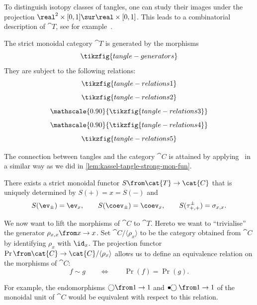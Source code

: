 To distinguish isotopy classes of tangles, one can study their images under the projection \(\real^2 \times [0,1] \sur \real \times [0,1]\).
This leads to a combinatorial description of \(\cat{T}\), see for example~\cite[Theorem~\textsc{xii}.2.2]{Kassel1998}.

\begin{proposition}\label{prop: presentation_tangle_category}
  The strict monoidal category \(\cat{T}\) is generated by the morphisms
  \[
    \tikzfig{tangle-generators}
  \]
  They are subject to the following relations:
  \[
    \tikzfig{tangle-relations1}
  \]
  \[
    \tikzfig{tangle-relations2}
  \]
  \[
    \mathscale{0.90}{\tikzfig{tangle-relations3}}
  \]
  \[
    \mathscale{0.90}{\tikzfig{tangle-relations4}}
  \]
  \[
    \tikzfig{tangle-relations5}
  \]
\end{proposition}

The connection between tangles and the category \(\cat{C}\) is attained by applying~\cite[Proposition~\textsc{xii}.1.4]{Kassel1998}
in a similar way as we did in \cref{lem:kassel-tangle-strong-mon-fun}.

\begin{lemma}\label{lem: functor_tangles_to_C}
  There exists a strict monoidal functor \(S \from \cat{T} \to \cat{C}\) that is uniquely determined by
  \(S(+) = x = S(-)\) and
  \[
    S(\ev_{\pm}) = \ev_x,
    \qquad  S(\coev_{\pm}) = \coev_x,
    \qquad S(\tau^{\pm}_{{+},{+}}) = \sigma_{x,x}.
  \]
\end{lemma}

We now want to lift the morphisms of \(\cat{C}\) to \(\cat{T}\).
Hereto we want to ``trivialise'' the generator \(\rho_{x,x}\from x \to x\).
Set \(\cat{C}/\langle \rho_x \rangle\) to be the category obtained from \(\cat{C}\) by identifying \(\rho_x\) with \(\id_x\).
The projection functor \(\Pr\from \cat{C} \to\cat{C}/\langle \rho_x \rangle\)
allows us to define an equivalence relation on the morphisms of \(\cat{C}\):
\[
  f \sim g \qquad \iff \qquad \Pr(f) = \Pr(g).
\]

For example, the endomorphisms \(\bigcirc\from 1 \to 1\) and \(\bullet\!\!\bigcirc \from 1\to 1\) of the monoidal unit of \(\cat{C}\) would be equivalent with respect to this relation.


